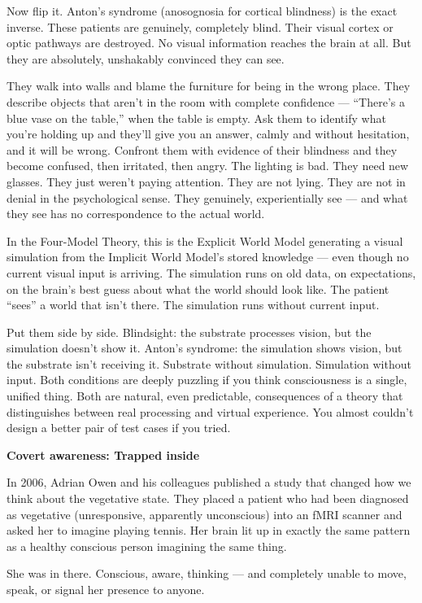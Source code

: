 \documentclass[11pt, twoside, openright]{book}
\begin{document}
Now flip it. Anton's syndrome (anosognosia for cortical blindness) is the exact inverse. These patients are genuinely, completely blind. Their visual cortex or optic pathways are destroyed. No visual information reaches the brain at all. But they are absolutely, unshakably convinced they can see.

They walk into walls and blame the furniture for being in the wrong place. They describe objects that aren't in the room with complete confidence --- ``There's a blue vase on the table,'' when the table is empty. Ask them to identify what you're holding up and they'll give you an answer, calmly and without hesitation, and it will be wrong. Confront them with evidence of their blindness and they become confused, then irritated, then angry. The lighting is bad. They need new glasses. They just weren't paying attention. They are not lying. They are not in denial in the psychological sense. They genuinely, experientially see --- and what they see has no correspondence to the actual world.

In the Four-Model Theory, this is the Explicit World Model generating a visual simulation from the Implicit World Model's stored knowledge --- even though no current visual input is arriving. The simulation runs on old data, on expectations, on the brain's best guess about what the world should look like. The patient ``sees'' a world that isn't there. The simulation runs without current input.

Put them side by side. Blindsight: the substrate processes vision, but the simulation doesn't show it. Anton's syndrome: the simulation shows vision, but the substrate isn't receiving it. Substrate without simulation. Simulation without input. Both conditions are deeply puzzling if you think consciousness is a single, unified thing. Both are natural, even predictable, consequences of a theory that distinguishes between real processing and virtual experience. You almost couldn't design a better pair of test cases if you tried.

\textbf{Covert awareness: Trapped inside}

In 2006, Adrian Owen and his colleagues published a study that changed how we think about the vegetative state. They placed a patient who had been diagnosed as vegetative (unresponsive, apparently unconscious) into an fMRI scanner and asked her to imagine playing tennis. Her brain lit up in exactly the same pattern as a healthy conscious person imagining the same thing.

She was in there. Conscious, aware, thinking --- and completely unable to move, speak, or signal her presence to anyone.
\end{document}

